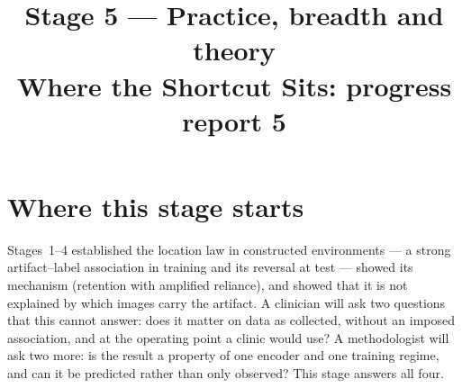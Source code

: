 

\newcommand{\notY}{1 = melanoma, malignant nodule, tumour with a solid component, erosion}
\newcommand{\notA}{a real artifact: hair, sonographer caliper, capsule debris}
\newcommand{\notROI}{lesion, nodule, tumour, union of expert lesion boxes}
\newcommand{\notCross}{$[\text{mask}-\text{ERM}]_{\text{Trap B}}-[\text{mask}-\text{ERM}]_{\text{Trap A}}$ of reversed-test AUROC.}
\newcommand{\notCI}{95\% crossed seed$\times$image bootstrap interval (Stage~1); thresholds are re-estimated in every replicate for operating points.}
\newcommand{\notExtra}{Hard pairs & positive--negative pairs whose artifact status conflicts with the test set's own artifact--label association (the cases a shortcut gets wrong). \\ OP1--OP5 & decision thresholds fixed on validation data: maximal balanced accuracy; specificity $\ge0.80$, $\ge0.90$; sensitivity $\ge0.80$, $\ge0.90$. \\}
\title{\textbf{Stage 5 --- Practice, breadth and theory}\\[3pt]\large Where the Shortcut Sits: progress report 5}
\author{}
\date{}

\maketitle
{}


\tableofcontents
\clearpage

\section{Where this stage starts}
Stages~1--4 established the location law in constructed environments --- a strong artifact--label association in
training and its reversal at test --- showed its mechanism (retention with amplified reliance), and showed that it is not
explained by which images carry the artifact. A clinician will ask two questions that this cannot answer: does it
matter on data as collected, without an imposed association, and at the operating point a clinic would use? A
methodologist will ask two more: is the result a property of one encoder and one training regime, and can it be
predicted rather than only observed? This stage answers all four.


